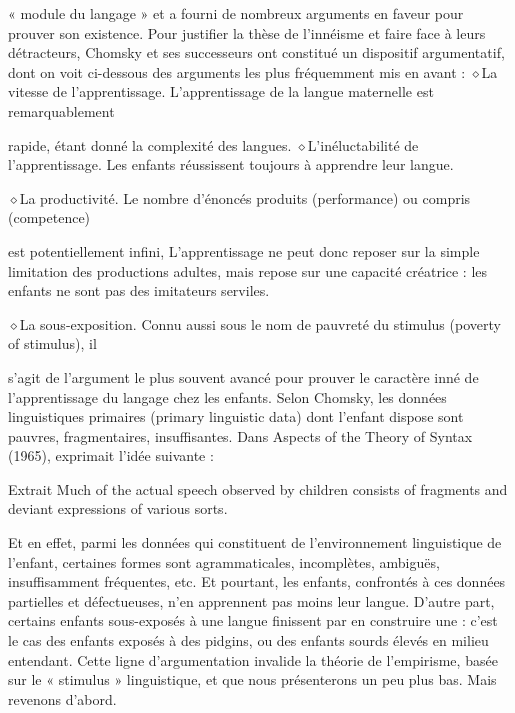« module du langage » et a fourni de nombreux arguments en faveur pour prouver son existence.
Pour justifier la thèse de l'innéisme et faire face à leurs détracteurs, Chomsky et ses successeurs ont
constitué un dispositif argumentatif, dont on voit ci-dessous des arguments les plus fréquemment
mis en avant :
\noindent\textcolor{BellaTeal}{$\diamond$}\enspace La vitesse de l'apprentissage. L'apprentissage de la langue maternelle est remarquablement\par
rapide, étant donné la complexité des langues.
\noindent\textcolor{BellaTeal}{$\diamond$}\enspace L'inéluctabilité de l'apprentissage. Les enfants réussissent toujours à apprendre leur langue.\par
\noindent\textcolor{BellaTeal}{$\diamond$}\enspace La productivité. Le nombre d’énoncés produits (performance) ou compris (competence)\par

est potentiellement infini, L'apprentissage ne peut donc reposer sur la simple limitation
des productions adultes, mais repose sur une capacité créatrice : les enfants ne sont pas des
imitateurs serviles.

\noindent\textcolor{BellaTeal}{$\diamond$}\enspace La sous-exposition. Connu aussi sous le nom de pauvreté du stimulus (poverty of stimulus), il\par
s'agit de l'argument le plus souvent avancé pour prouver le caractère inné de l'apprentissage
du langage chez les enfants. Selon Chomsky, les données linguistiques primaires (primary
linguistic data) dont l'enfant dispose sont pauvres, fragmentaires, insuffisantes. Dans Aspects
of the Theory of Syntax (1965), exprimait l’idée suivante :

\begin{lecture}{Extrait}
Much of the actual speech observed by children consists of fragments and deviant expressions of various sorts.
\end{lecture}
Et en effet, parmi les données qui constituent de l’environnement linguistique de l'enfant, certaines
formes sont agrammaticales, incomplètes, ambiguës, insuffisamment fréquentes, etc. Et pourtant,
les enfants, confrontés à ces données partielles et défectueuses, n'en apprennent pas moins leur
langue. D'autre part, certains enfants sous-exposés à une langue finissent par en construire une :
c'est le cas des enfants exposés à des pidgins, ou des enfants sourds élevés en milieu entendant.
Cette ligne d’argumentation invalide la théorie de l'empirisme, basée sur le « stimulus »
linguistique, et que nous présenterons un peu plus bas. Mais revenons d’abord.

